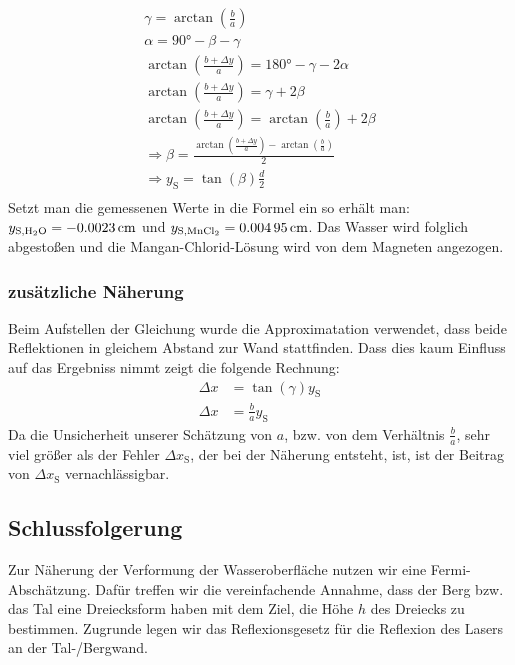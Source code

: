 \documentclass[
	a4paper,
	12pt,
	pagesize,
	ngerman
]{scrartcl}
\begin{document}
	\begin{gather*}
		\gamma = \arctan \left(\frac{b}{a}\right) \\
		\alpha = \ang{90} - \beta - \gamma \\
		\arctan \left(\frac{b+\Delta y}{a}\right) = \ang{180} - \gamma - 2\alpha \\
		\arctan \left(\frac{b+\Delta y}{a}\right) = \gamma + 2 \beta \\
		\arctan \left(\frac{b+\Delta y}{a}\right) =   \arctan \left(\frac{b}{a}\right) + 2 \beta \\
		\Rightarrow \beta = \frac{\arctan \left(\frac{b+\Delta y}{a}\right) -  \arctan \left(\frac{b}{a}\right)}{2} \\
		\Rightarrow y_\text{S} = \tan (\beta) \frac{d}{2}  \\
	\end{gather*}
	Setzt man die gemessenen Werte in die Formel ein so erhält man: $ y_{\text{S,\ce{H2O}}} = \SI{-0,0023}{ cm} $ und $y_{\text{S,\ce{MnCl2}}} = \SI{0,00495}{ cm} $. Das Wasser wird folglich abgestoßen und die Mangan-Chlorid-Lösung wird von dem Magneten angezogen.
	\subsubsection*{zusätzliche Näherung}
	Beim Aufstellen der Gleichung wurde die Approximatation verwendet, dass beide Reflektionen in gleichem Abstand zur Wand stattfinden. Dass dies kaum Einfluss auf das Ergebniss nimmt zeigt die folgende Rechnung:
	\begin{align*}
		\Delta x &= \tan (\gamma) y_\text{S} \\
		\Delta x &= \frac{b}{a} y_\text{S}
	\end{align*}
	Da die Unsicherheit unserer Schätzung von $a$, bzw. von dem Verhältnis $\frac{b}{a}$, sehr viel größer als der Fehler $\Delta x_\text{S}$, der bei der Näherung entsteht, ist, ist der Beitrag von $\Delta x_\text{S}$ vernachlässigbar.



	\subsection{Schlussfolgerung}
	Zur Näherung der Verformung der Wasseroberfläche nutzen wir eine Fermi-Abschätzung. Dafür treffen wir die vereinfachende Annahme, dass der Berg bzw. das Tal eine Dreiecksform haben mit dem Ziel, die Höhe $h$ des Dreiecks zu bestimmen. Zugrunde legen wir das Reflexionsgesetz für die Reflexion des Lasers an der Tal-/Bergwand.
	
\end{document}
